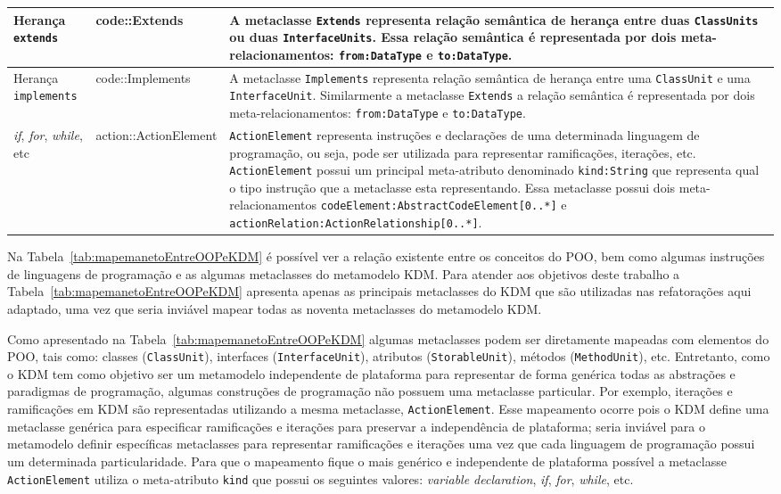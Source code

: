 \begin{longtable}[c]{| m{1.9cm} | m{3.57cm}| m{9.3cm} |}
\hline
Herança \texttt{extends} & code::Extends & A metaclasse \texttt{Extends} representa relação semântica de herança entre duas \texttt{ClassUnits} ou duas \texttt{InterfaceUnits}. Essa relação semântica é representada por dois meta-relacionamentos: \texttt{from:DataType} e \texttt{to:DataType}.\\ 
\hline
Herança \texttt{implements} & code::Implements & A metaclasse \texttt{Implements} representa relação semântica de herança entre uma \texttt{ClassUnit} e uma \texttt{InterfaceUnit}. Similarmente a metaclasse \texttt{Extends} a relação semântica é representada por dois meta-relacionamentos: \texttt{from:DataType} e \texttt{to:DataType}.\\ 
\hline
\textit{if}, \textit{for}, \textit{while}, etc & action::ActionElement & \texttt{ActionElement} representa instruções e declarações de uma determinada linguagem de programação, ou seja, pode ser utilizada para representar ramificações, iterações, etc. \texttt{ActionElement} possui um principal meta-atributo denominado \texttt{kind:String} que representa qual o tipo instrução que a metaclasse esta representando. Essa metaclasse possui dois meta-relacionamentos \texttt{codeElement:AbstractCodeElement[0..*]} e \texttt{actionRelation:ActionRelationship[0..*]}.\\ 
\hline
 \end{longtable}


Na Tabela~\ref{tab:mapemanetoEntreOOPeKDM} é possível ver a relação existente entre os conceitos do POO, bem como algumas instruções de linguagens de programação e as algumas metaclasses do metamodelo KDM. Para atender aos objetivos deste trabalho a Tabela~\ref{tab:mapemanetoEntreOOPeKDM} apresenta apenas as principais metaclasses do KDM que são utilizadas nas refatorações aqui adaptado, uma vez que seria inviável mapear todas as noventa metaclasses do metamodelo KDM.

Como apresentado na Tabela~\ref{tab:mapemanetoEntreOOPeKDM} algumas metaclasses podem ser diretamente mapeadas com elementos do POO, tais como: classes (\texttt{ClassUnit}), interfaces (\texttt{InterfaceUnit}), atributos (\texttt{StorableUnit}), métodos (\texttt{MethodUnit}), etc. Entretanto, como o KDM tem como objetivo ser um metamodelo independente de plataforma para representar de forma genérica todas as abstrações e paradigmas de programação, algumas construções de programação não possuem uma metaclasse particular. Por exemplo, iterações e ramificações em KDM são representadas utilizando a mesma metaclasse, \texttt{ActionElement}. Esse mapeamento ocorre pois o KDM define uma metaclasse genérica para especificar ramificações e iterações para preservar a independência de plataforma; seria inviável para o metamodelo definir específicas metaclasses para representar ramificações e iterações uma vez que cada linguagem de programação possui um determinada particularidade. Para que o mapeamento fique o mais genérico e independente de plataforma possível a metaclasse \texttt{ActionElement} utiliza o meta-atributo \texttt{kind} que possui os seguintes valores: \textit{variable declaration}, \textit{if}, \textit{for}, \textit{while}, etc.

